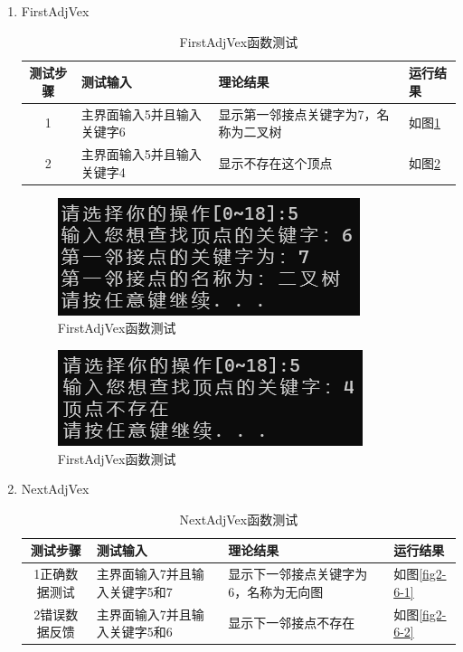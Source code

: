 \documentclass[supercite]{Experimental_Report}
\theoremstyle{definition}
\begin{document}
\begin{enumerate}
	
	\item FirstAdjVex
	\begin{table}[h!]
		\begin{center}
			\caption{FirstAdjVex函数测试}
			\begin{tabular}{|c|p{4cm}<{\centering}|p{4cm}<{\centering}|p{4cm}<{\centering}|} 
				\hline
				\textbf{测试步骤} & \textbf{测试输入} & \textbf{理论结果} & \textbf{运行结果} \\
				\hline
				1 &   主界面输入5并且输入关键字6 & 显示第一邻接点关键字为7，名称为二叉树 & 如图\ref{fig2-5-1}\\
				\hline
				2 &   主界面输入5并且输入关键字4 & 显示不存在这个顶点 & 如图\ref{fig2-5-2}\\
				\hline
			\end{tabular}
		\end{center}
	\end{table}
	
	
	\begin{figure}[H] %
		\begin{center}
			\includegraphics[width=0.5\linewidth]{images/graph/5-1.png}
			\caption{FirstAdjVex函数测试}
			\label{fig2-5-1}
		\end{center}
	\end{figure}
	
	\begin{figure}[H] %
		\begin{center}
			\includegraphics[width=0.5\linewidth]{images/graph/5-2.png}
			\caption{FirstAdjVex函数测试}
			\label{fig2-5-2}
		\end{center}
	\end{figure}
	
	\item NextAdjVex
	\begin{table}[h!]
		\begin{center}
			\caption{NextAdjVex函数测试}
			\begin{tabular}{|c|p{4cm}<{\centering}|p{4cm}<{\centering}|p{4cm}<{\centering}|} 
				\hline
				\textbf{测试步骤} & \textbf{测试输入} & \textbf{理论结果} & \textbf{运行结果} \\
				\hline
				1正确数据测试 & 主界面输入7并且输入关键字5和7 & 显示下一邻接点关键字为6，名称为无向图 & 如图\ref{fig2-6-1}\\
				\hline
				2错误数据反馈 & 主界面输入7并且输入关键字5和6 & 显示下一邻接点不存在 & 如图\ref{fig2-6-2}\\
				\hline
			\end{tabular}
		\end{center}
	\end{table}
	

\end{enumerate}
\end{document}
